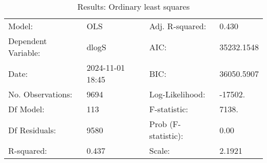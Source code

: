 \begin{table}
\caption{Results: Ordinary least squares}
\label{}
\begin{center}
\begin{tabular}{llll}
\hline
Model:              & OLS              & Adj. R-squared:     & 0.430       \\
Dependent Variable: & dlogS            & AIC:                & 35232.1548  \\
Date:               & 2024-11-01 18:45 & BIC:                & 36050.5907  \\
No. Observations:   & 9694             & Log-Likelihood:     & -17502.     \\
Df Model:           & 113              & F-statistic:        & 7138.       \\
Df Residuals:       & 9580             & Prob (F-statistic): & 0.00        \\
R-squared:          & 0.437            & Scale:              & 2.1921      \\
\hline
\end{tabular}
\end{center}


\end{table}

